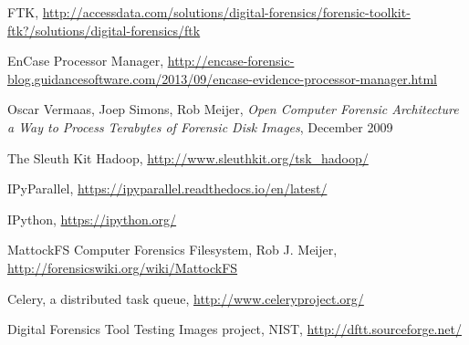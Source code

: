 \documentclass[twoside]{article}
\begin{document}
\begin{multicols}{2}
\begin{thebibliography}{99}
    FTK,
    \href{http://accessdata.com/solutions/digital-forensics/forensic-toolkit-ftk?/solutions/digital-forensics/ftk}{http://accessdata.com/solutions/digital-forensics/forensic-toolkit-ftk?/solutions/digital-forensics/ftk}

    EnCase Processor Manager,
    \href{http://encase-forensic-blog.guidancesoftware.com/2013/09/encase-evidence-processor-manager.html}{http://encase-forensic-blog.guidancesoftware.com/2013/09/encase-evidence-processor-manager.html}

    Oscar Vermaas, Joep Simons, Rob Meijer,
    \emph{Open Computer Forensic Architecture a Way to Process Terabytes of Forensic Disk Images},
    December 2009

    The Sleuth Kit Hadoop,
    \href{http://www.sleuthkit.org/tsk\_hadoop/}{http://www.sleuthkit.org/tsk\_hadoop/}

    IPyParallel,
    \href{https://ipyparallel.readthedocs.io/en/latest/}{https://ipyparallel.readthedocs.io/en/latest/}

    IPython,
    \href{https://ipython.org/}{https://ipython.org/}

    MattockFS Computer Forensics Filesystem,
    Rob J. Meijer,
    \href{http://forensicswiki.org/wiki/MattockFS}{http://forensicswiki.org/wiki/MattockFS}

    Celery, a distributed task queue,
    \href{http://www.celeryproject.org/}{http://www.celeryproject.org/}

    Digital Forensics Tool Testing Images project,
    NIST,
    \href{http://dftt.sourceforge.net/}{http://dftt.sourceforge.net/}

\end{thebibliography}


\end{multicols}
\end{document}
